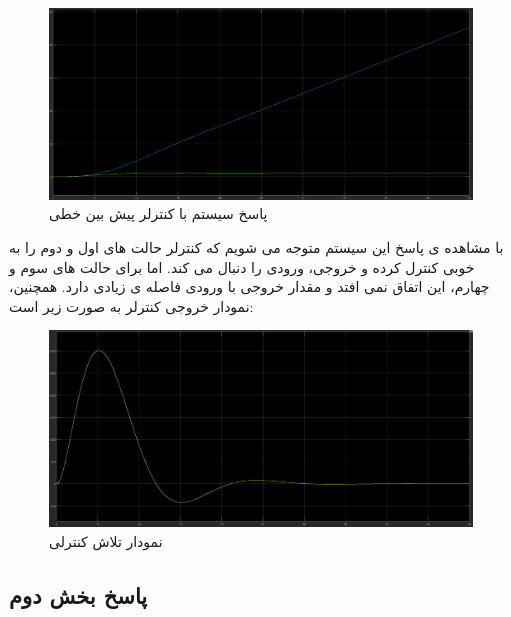 \begin{figure}[H]
	\centering
	\includegraphics[width=1\linewidth]{../img/Q2_LMPC_Response}
	\caption{پاسخ سیستم با کنترلر پیش بین خطی}
	\label{fig:q2lmpcresponse}
\end{figure}
با مشاهده ی پاسخ این سیستم متوجه می شویم که کنترلر حالت های اول و دوم را به خوبی کنترل کرده و خروجی، ورودی را دنبال می کند. اما برای حالت های سوم و چهارم، این اتفاق نمی افتد و مقدار خروجی با ورودی فاصله ی زیادی دارد.
همچنین، نمودار خروجی کنترلر به صورت زیر است:
\begin{figure}[H]
	\centering
	\includegraphics[width=1\linewidth]{../img/Q2_LMPC_ِCeffort}
	\caption{نمودار تلاش کنترلی}
	\label{fig:q2lmpcceffort}
\end{figure}
\subsection*{پاسخ بخش دوم}
